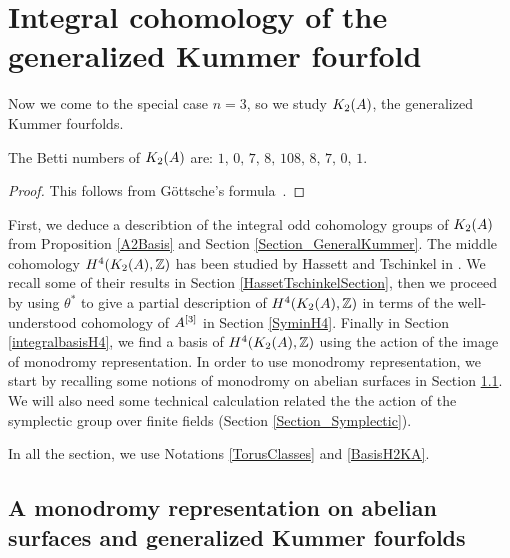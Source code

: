 
\section{Integral cohomology of the generalized Kummer fourfold}
Now we come to the special case $n=3$, so we study $\kum{A}{2}$, the generalized Kummer fourfolds.
\begin{proposition}
The Betti numbers of $\kum{A}{2}$ are:
$
1,\,0,\,7,\,8,\,108,\,8,\,7,\,0,\,1.
$
\end{proposition}
\begin{proof}
This follows from G\"ottsche's formula~\cite[page 49]{Gottsche}.
\end{proof}

First, we deduce a describtion of the integral odd cohomology groups of $\X$ from Proposition \ref{A2Basis} and Section \ref{Section_GeneralKummer}.
The middle cohomology $H^4(\X,\Z)$ has been studied by Hassett and Tschinkel in \cite{Hassett}. We recall some of their results in Section \ref{HassetTschinkelSection},
then we proceed by using $\theta^*$ to give a partial description of $H^4(\X,\Z)$ in terms of the well-understood cohomology of $A\hilb{3}$ in Section \ref{SyminH4}. 
Finally in Section \ref{integralbasisH4}, we find a basis of $H^4(\X,\Z)$ using the action of the image of monodromy representation.
In order to use monodromy representation, we start by recalling some notions of monodromy on abelian surfaces in Section \ref{monodromyexplication}. 
We will also need some technical calculation related the the action of the symplectic group over finite fields (Section \ref{Section_Symplectic}).

In all the section, we use Notations \ref{TorusClasses} and \ref{BasisH2KA}.

\subsection{A monodromy representation on abelian surfaces and generalized Kummer fourfolds}\label{monodromyexplication}


